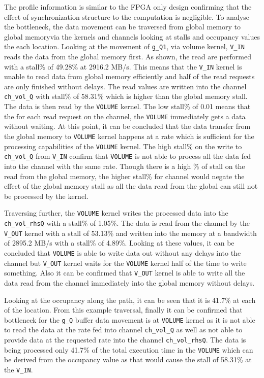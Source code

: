 The profile information is similar to the FPGA only design confirming
that the effect of synchronization structure to the computation is
negligible. To analyse the bottleneck, the data movement can be traversed
from global memory to global memoryvia the kernels and channels looking at
stalls and occupancy values the each location. Looking at the movement of
\texttt{g\_Q1}, via volume kernel, \texttt{V\_IN} reads the data from the
global memory first. As shown, the read are performed with a stall\%
of 49.28\% at 2916.2 MB/s. This means that the \texttt{V\_IN} kernel is unable to read
data from global memory efficiently and half of the read requests
are only finished without delays. The read values are written into
the channel \texttt{ch\_vol\_Q} with stall\% of 58.31\% which is higher
than the global memory stall. The data is then read by the \texttt{VOLUME}
kernel. The low stall\% of 0.01 means that the for each read request
on the channel, the \texttt{VOLUME} immediately gets a data without
waiting. At this point, it can be concluded that the data transfer from the global
memory to \texttt{VOLUME} kernel happens at a rate which is sufficient for
the processing capabilities of the \texttt{VOLUME} kernel. The high stall\%
on the write to \texttt{ch\_vol\_Q} from \texttt{V\_IN} confirm that
\texttt{VOLUME} is not able to process all the data fed into the channel
with the same rate. Though there is a high \% of stall on the read
from the global memory, the higher stall\% for channel would
negate the effect of the global memory stall as all the data
read from the global can still not be processed by the kernel.

Traversing further, the \texttt{VOLUME} kernel writes the processed
data into the \texttt{ch\_vol\_rhsQ} with a stall\% of 1.05\%.
The data is read from the channel by the \texttt{V\_OUT} kernel
with a stall of 53.13\% and written into the memory at a
bandwidth of 2895.2 MB/s with a stall\% of 4.89\%. Looking at these
values, it can be concluded that \texttt{VOLUME} is able to write data
out without any delays into the channel but \texttt{V\_OUT} kernel
waits for the \texttt{VOLUME} kernel half of the time to write
something. Also it can be confirmed that \texttt{V\_OUT} kernel is
able to write all the data read from the channel immediately into
the global memory without delays.

Looking at the occupancy along the path, it can be seen that
it is 41.7\% at each of the location. From this example traversal,
finally it can be confirmed that bottleneck for the \texttt{g\_Q}
buffer data movement is at \texttt{VOLUME} kernel as it is not
able to read the data at the rate fed into channel
\texttt{ch\_vol\_Q} as well as not able to provide data at
the requested rate into the channel \texttt{ch\_vol\_rhsQ}.
The data is being processed only 41.7\% of the total execution
time in the \texttt{VOLUME} which can be derived from the occupancy
value as that would cause the stall of 58.31\% at the \texttt{V\_IN}.

